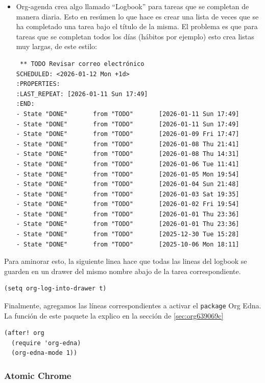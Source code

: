 \documentclass[11pt]{article}
\begin{document}
\begin{itemize}
\item Org-agenda crea algo llamado ``Logbook'' para tareas que se completan de manera diaria. Esto en resúmen lo que hace es crear una lista de veces que se ha completado una tarea bajo el título de la misma. El problema es que para tareas que se completan todos los días (hábitos por ejemplo) esto crea listas muy largas, de este estilo:

\begin{verbatim}
 ** TODO Revisar correo electrónico
SCHEDULED: <2026-01-12 Mon +1d>
:PROPERTIES:
:LAST_REPEAT: [2026-01-11 Sun 17:49]
:END:
- State "DONE"       from "TODO"       [2026-01-11 Sun 17:49]
- State "DONE"       from "TODO"       [2026-01-11 Sun 17:49]
- State "DONE"       from "TODO"       [2026-01-09 Fri 17:47]
- State "DONE"       from "TODO"       [2026-01-08 Thu 21:41]
- State "DONE"       from "TODO"       [2026-01-08 Thu 14:31]
- State "DONE"       from "TODO"       [2026-01-06 Tue 11:41]
- State "DONE"       from "TODO"       [2026-01-05 Mon 19:54]
- State "DONE"       from "TODO"       [2026-01-04 Sun 21:48]
- State "DONE"       from "TODO"       [2026-01-03 Sat 19:35]
- State "DONE"       from "TODO"       [2026-01-02 Fri 19:54]
- State "DONE"       from "TODO"       [2026-01-01 Thu 23:36]
- State "DONE"       from "TODO"       [2026-01-01 Thu 23:36]
- State "DONE"       from "TODO"       [2025-12-30 Tue 15:28]
- State "DONE"       from "TODO"       [2025-10-06 Mon 18:11]

\end{verbatim}
\end{itemize}

Para aminorar esto, la siguiente linea hace que todas las lineas del logbook se guarden en un drawer del mismo nombre abajo de la tarea correspondiente.

\begin{verbatim}
(setq org-log-into-drawer t)
\end{verbatim}

Finalmente, agregamos las líneas correspondientes a activar el \texttt{package} Org Edna. La función de este paquete la explico en la sección de \ref{sec:org639069c}

\begin{verbatim}
(after! org
  (require 'org-edna)
  (org-edna-mode 1))
\end{verbatim}
\subsubsection{Atomic Chrome}
\label{sec:org7568294}
\end{document}
